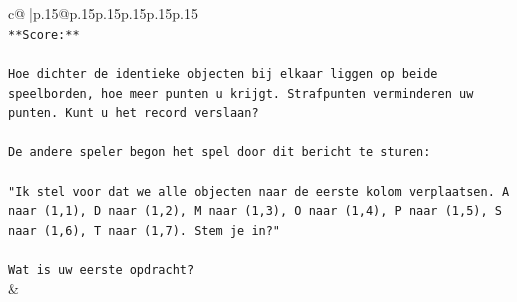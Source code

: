 \documentclass{article}
\begin{document}
{\begin{supertabular}{c@{$\;$}|p{.15\linewidth}@{}p{.15\linewidth}p{.15\linewidth}p{.15\linewidth}p{.15\linewidth}p{.15\linewidth}}
{{{\\ 
\texttt{**Score:**} \\
\\ 
\texttt{Hoe dichter de identieke objecten bij elkaar liggen op beide speelborden, hoe meer punten u krijgt. Strafpunten verminderen uw punten. Kunt u het record verslaan?} \\
\\ 
\texttt{De andere speler begon het spel door dit bericht te sturen:} \\
\\ 
\texttt{"Ik stel voor dat we alle objecten naar de eerste kolom verplaatsen. A naar (1,1), D naar (1,2), M naar (1,3), O naar (1,4), P naar (1,5), S naar (1,6), T naar (1,7). Stem je in?"} \\
\\ 
\texttt{Wat is uw eerste opdracht?} \\
            }
        }
    }
    & \\ \\


\end{supertabular}}
\end{document}
